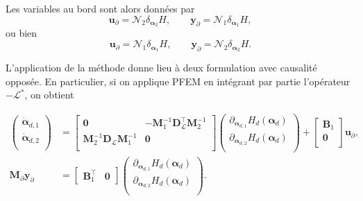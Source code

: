 Les variables au bord sont alors données par
\begin{equation*}
\bm{u}_\partial = \mathcal{N}_2 \displaystyle \delta_{\bm{\alpha}_2}H, \qquad  \bm{y}_\partial = \mathcal{N}_1 \displaystyle \delta_{\bm{\alpha}_1}H, 
\end{equation*}
ou bien
\begin{equation*}
\bm{u}_\partial = \mathcal{N}_1 \displaystyle \delta_{\bm{\alpha}_1}H, \qquad 
\bm{y}_\partial = \mathcal{N}_2 \displaystyle \delta_{\bm{\alpha}_2}H.
\end{equation*}

L'application de la méthode donne lieu à deux formulation avec causalité opposée. En particulier, si on applique PFEM en intégrant par partie l'opérateur $-\mathcal{L}^*$, on obtient

\begin{equation*}
\begin{aligned}
\begin{pmatrix}
\dot{\bm{\alpha}}_{d, 1} \\
\dot{\bm{\alpha}}_{d, 2} \\
\end{pmatrix}
&= \begin{bmatrix}
\mathbf{0} & - \mathbf{M}_1^{-1} \mathbf{D}_{\mathcal{L}}^\top \mathbf{M}_2^{-1}\\
\mathbf{M}_2^{-1} \mathbf{D}_{\mathcal{L}} \mathbf{M}_1^{-1} & \mathbf{0} \\
\end{bmatrix} 
\begin{pmatrix}
\partial_{\bm{\alpha}_{d, 1}} H_d(\bm{\alpha}_d)\\
\partial_{\bm{\alpha}_{d, 2}} H_d(\bm{\alpha}_d)\\
\end{pmatrix} + 
\begin{bmatrix}
\mathbf{B}_1\\
\mathbf{0}\\
\end{bmatrix}
\mathbf{u}_\partial,  \\
\mathbf{M}_\partial {\mathbf{y}_\partial} &= \begin{bmatrix}
\mathbf{B}_1^\top & \mathbf{0}
\end{bmatrix}\begin{pmatrix}
\partial_{\bm{\alpha}_{d, 1}} H_d(\bm{\alpha}_d)\\
\partial_{\bm{\alpha}_{d, 2}} H_d(\bm{\alpha}_d)\\
\end{pmatrix}.
\end{aligned}
\end{equation*}

